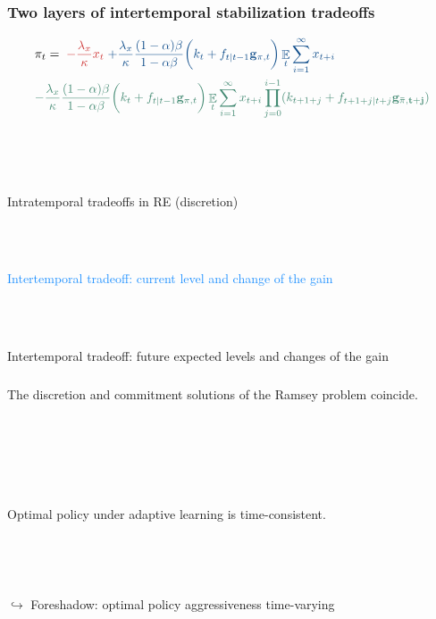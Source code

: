 \documentclass[10pt]{beamer}
\DeclareMathOperator{\E}{\mathbb{E}}
\begin{document}
\begin{frame}
	\frametitle{Two layers of intertemporal stabilization tradeoffs}
\small{
\begin{align*}
& \pi_t  =  \; \textcolor{brownreddark}{-\frac{\lambda_x}{\kappa} x_t} \textcolor{dodgerblue}{ \; + \frac{\lambda_x}{\kappa} \frac{(1-\alpha)\beta}{1-\alpha\beta} \bigg(k_t+ f_{t|t-1}\mathbf{g}_{\pi,t} \bigg)\E_t\sum_{i=1}^{\infty}x_{t+i}}  \\
& \textcolor{aquamarinegreen}{- \frac{\lambda_x}{\kappa} \frac{(1-\alpha)\beta}{1-\alpha\beta} \bigg(k_t+ f_{t|t-1}\mathbf{g}_{\pi,t} \bigg)\E_t\sum_{i=1}^{\infty}x_{t+i}\prod_{j=0}^{i-1}(k_{t+1+j}+ f_{t+1+j|t+j}\mathbf{g_{\bar{\pi},t+j}} )}
\end{align*}

\

\

\textcolor{brownreddark}{Intratemporal tradeoffs in RE (discretion)} \\

\

\

\textcolor{dodgerblue}{Intertemporal tradeoff: current level and change of the gain } \\

\

\

\textcolor{aquamarinegreen}{Intertemporal tradeoff: future expected levels and changes of the gain}

}
\end{frame}

\begin{frame}
	\frametitle{}
	\label{no_commitment}

\begin{lemma} The discretion and commitment solutions of the Ramsey problem coincide. 
\end{lemma}

\

\hfill \hyperlink{no_commitment_intuition}{}

\

\

\begin{corollary} Optimal policy under adaptive learning is time-consistent. 
\end{corollary}


\

\

$\hookrightarrow $ Foreshadow: optimal policy aggressiveness time-varying

\vfill




\end{frame}
\end{document}
